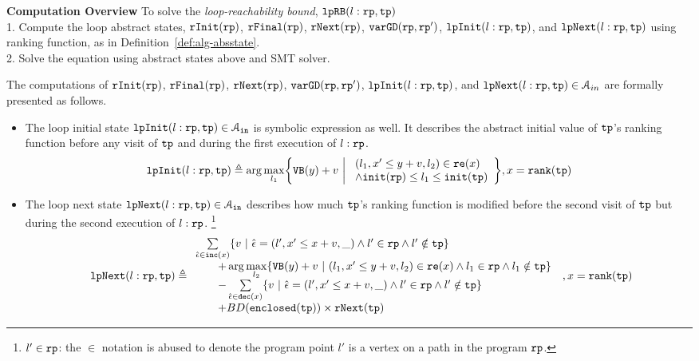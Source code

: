 \textbf{Computation Overview}
To solve the \emph{loop-reachability bound}, $\mathtt{lpRB}(l: \mathtt{rp}, \mathtt{tp})$
  \\
  1. Compute the loop abstract states,
  $\mathtt{rInit}(\mathtt{rp})$, $\mathtt{rFinal}(\mathtt{rp})$, $\mathtt{rNext}(\mathtt{rp})$, $\mathtt{varGD}(\mathtt{rp}, \mathtt{rp}')$, 
  $\mathtt{lpInit}(l: \mathtt{rp}, \mathtt{tp})$, and $\mathtt{lpNext}(l: \mathtt{rp}, \mathtt{tp})$ using ranking function,
  as in Definition~\ref{def:alg-absstate}.
  \\
  2. Solve the equation using abstract states above and SMT solver.
\begin{defn}
\label{def:alg-loopabsstate}
   The computations of 
   $\mathtt{rInit}(\mathtt{rp})$, $\mathtt{rFinal}(\mathtt{rp})$, $\mathtt{rNext}(\mathtt{rp})$, $\mathtt{varGD}(\mathtt{rp}, \mathtt{rp}')$, 
   $\mathtt{lpInit}(l: \mathtt{rp}, \mathtt{tp})$, and $\mathtt{lpNext}(l: \mathtt{rp}, \mathtt{tp}) \in \mathcal{A}_{in}$
   are formally presented as follows.
   \begin{itemize}%
   \item 
The loop initial state 
$\mathtt{lpInit}(l: \mathtt{rp}, \mathtt{tp}) \in \mathcal{A}_{\mathtt{in}}$ is symbolic expression as well. 
It describes the abstract initial value of $\mathtt{tp}$'s ranking function before
any visit of $\mathtt{tp}$ and during the first execution of $l: \mathtt{rp}$.
\[
  \lpinit(l: \rprog, \tpath) \triangleq 
  \arg\max_{l_1}\left\{
       \varinvar(y) + v ~\middle\vert~ 
       \begin{array}{l} 
         (l_1, x' \leq y + v, l_2) \in \reset(x) 
         \\
         \land \absinit(\rprog) \leq l_1 \leq \absinit(\tpath)
       \end{array}
     \right\}
    , x = \locbound(\tpath)
  \]
\item
The loop next state 
$\mathtt{lpNext}(l: \mathtt{rp}, \mathtt{tp}) \in \mathcal{A}_{\mathtt{in}}$ 
describes how much $\mathtt{tp}$'s ranking function
is modified before
the second visit of $\mathtt{tp}$ but during the second execution of $l: \mathtt{rp}$.
\footnote{$l' \in \mathtt{rp}$: the $\in$ notation is abused to denote
the program point $l'$ is a vertex on a path in the program $\mathtt{rp}$.}
%
\[
  \begin{array}{l}
  \lpnext(l: \rprog, \tpath) \triangleq 
    \begin{array}{l}
  \sum\limits_{\absevent \in \inc(x) }
  \left\{ 
      v ~\middle\vert~ \absevent = (l', x' \leq x + v, \_) \land  l' \in \rprog 
      \land l' \notin \tpath \right\}
      \\ \qquad 
      + \arg\max\limits_{l_2 }
         \left\{ \varinvar(y) + v ~\middle\vert~ 
         (l_1, x' \leq y + v, l_2) \in \reset(x) \land l_1 \in \rprog \land l_1 \notin \tpath\right\}
     \\ \qquad 
      - \sum\limits_{ \absevent \in \dec(x) }\left\{ 
      v 
      ~\middle\vert~ \absevent = (l', x' \leq x + v, \_) \land l' \in \rprog \land l' \notin \tpath \right\}
      \\ \qquad 
      + BD(\kw{enclosed}(\tpath)) \times \rfnext(\tpath)
    \end{array}
  \end{array}
  , x = \locbound(\tpath)
  \]
    \end{itemize}
\end{defn}
